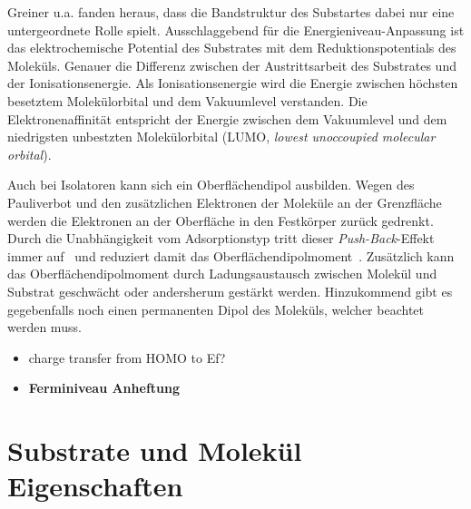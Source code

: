             Greiner u.a. \cite{IF_3} fanden heraus, dass die Bandstruktur des Substartes dabei nur eine untergeordnete Rolle spielt.
            Ausschlaggebend für die Energieniveau-Anpassung ist das elektrochemische Potential des Substrates mit dem Reduktionspotentials des Moleküls.
            Genauer die Differenz zwischen der Austrittsarbeit des Substrates und der Ionisationsenergie.
            Als Ionisationsenergie wird die Energie zwischen höchsten besetztem Molekülorbital und dem Vakuumlevel verstanden.
            Die Elektronenaffinität entspricht der Energie zwischen dem Vakuumlevel und dem niedrigsten unbestzten Molekülorbital (LUMO, \textit{lowest unoccoupied molecular orbital}).

            Auch bei Isolatoren kann sich ein Oberflächendipol ausbilden.
            Wegen des Pauliverbot und den zusätzlichen Elektronen der Moleküle an der Grenzfläche werden die Elektronen an der Oberfläche in den Festkörper zurück gedrenkt.
            Durch die Unabhängigkeit vom Adsorptionstyp tritt dieser \textit{Push-Back}-Effekt immer auf~\cite{IF_4} und reduziert damit das Oberflächendipolmoment~\cite{IF_1}.
            Zusätzlich kann das Oberflächendipolmoment durch Ladungsaustausch zwischen Molekül und Substrat geschwächt oder andersherum gestärkt werden.
            Hinzukommend gibt es gegebenfalls noch einen permanenten Dipol des Moleküls, welcher beachtet werden muss.

            \begin{itemize}
                \item charge transfer from HOMO to Ef? \cite{IF_4}
                \item \textbf{Ferminiveau Anheftung}
            \end{itemize}


    \section{Substrate und Molekül Eigenschaften}
